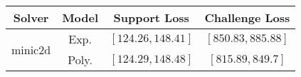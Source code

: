 \begin{tabular}{cc|c|c} 
\hline 
 Solver & Model & Support Loss  & Challenge Loss \tabularnewline\hline 
\hline 
\multirow{2}{*}{minic2d} & Exp. & $\left[124.26,148.41\right]$ & $\left[850.83,885.88\right]$ \tabularnewline 
 & Poly. & $\mathbf{\left[124.29,148.48\right]}$ & $\mathbf{\left[815.89,849.7\right]}$ \tabularnewline 
\hline 
\end{tabular} 

